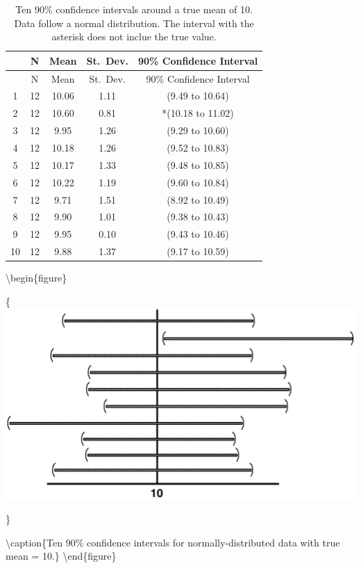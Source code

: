 \documentclass[]{book}
\begin{document}
\begin{longtable}[]{@{}ccccc@{}}
\caption{\label{tab:3-1} Ten 90\% confidence intervals around a true mean of 10. Data follow a normal distribution. The interval with the asterisk does not inclue the true value.}\tabularnewline
\toprule
& N & Mean & St.~Dev. & 90\% Confidence Interval\tabularnewline
\midrule
\endfirsthead
\toprule
& N & Mean & St.~Dev. & 90\% Confidence Interval\tabularnewline
\midrule
\endhead
1 & 12 & 10.06 & 1.11 & (9.49 to 10.64)\tabularnewline
2 & 12 & 10.60 & 0.81 & *(10.18 to 11.02)\tabularnewline
3 & 12 & 9.95 & 1.26 & (9.29 to 10.60)\tabularnewline
4 & 12 & 10.18 & 1.26 & (9.52 to 10.83)\tabularnewline
5 & 12 & 10.17 & 1.33 & (9.48 to 10.85)\tabularnewline
6 & 12 & 10.22 & 1.19 & (9.60 to 10.84)\tabularnewline
7 & 12 & 9.71 & 1.51 & (8.92 to 10.49)\tabularnewline
8 & 12 & 9.90 & 1.01 & (9.38 to 10.43)\tabularnewline
9 & 12 & 9.95 & 0.10 & (9.43 to 10.46)\tabularnewline
10 & 12 & 9.88 & 1.37 & (9.17 to 10.59)\tabularnewline
\bottomrule
\end{longtable}

\textbackslash{}begin\{figure\}

\{\centering \includegraphics[width=14.65in]{figures/3_1}

\}

\textbackslash{}caption\{Ten 90\% confidence intervals for normally-distributed data with true mean = 10.\}\label{fig:fig-3-1}
\textbackslash{}end\{figure\}
\end{document}
